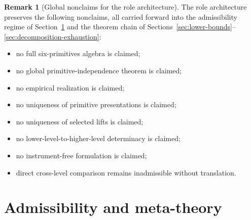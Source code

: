 \documentclass[11pt]{article}
\theoremstyle{definition}
\newtheorem{remark}[theorem]{Remark}
\begin{document}
\begin{remark}[Global nonclaims for the role architecture]\label{rem:atlas-global-nonclaims}
The role architecture preserves the following nonclaims, all carried
forward into the admissibility regime of
Section~\ref{sec:admissibility-meta-theory} and the theorem chain of
Sections~\ref{sec:lower-bounds}--\ref{sec:decomposition-exhaustion}:
\begin{itemize}[topsep=2pt,itemsep=1pt]
  \item no full six-primitives algebra is claimed;
  \item no global primitive-independence theorem is claimed;
  \item no empirical realization is claimed;
  \item no uniqueness of primitive presentations is claimed;
  \item no uniqueness of selected lifts is claimed;
  \item no lower-level-to-higher-level determinacy is claimed;
  \item no instrument-free formulation is claimed;
  \item direct cross-level comparison remains inadmissible without
    translation.
\end{itemize}
\end{remark} \section{Admissibility and meta-theory}\label{sec:admissibility-meta-theory}
\end{document}
